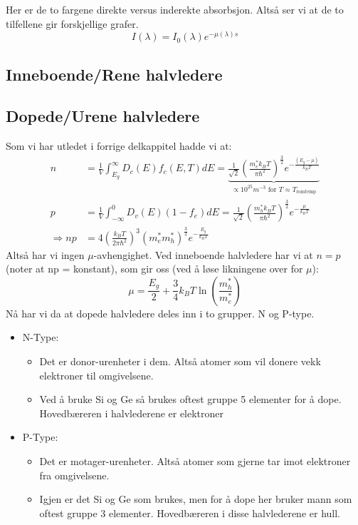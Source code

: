\documentclass{article}
\begin{document}
Her er de to fargene direkte versus inderekte absorbsjon. Altså ser vi at de to tilfellene gir forskjellige grafer.
\begin{equation*}
  I(\lambda) = I_0(\lambda) e^{-\mu (\lambda) s}
\end{equation*}






\subsection{Inneboende/Rene halvledere}
\subsection{Dopede/Urene halvledere}
Som vi har utledet i forrige delkappitel hadde vi at:
\begin{align*}
  n &= \frac{1}{V} \int_{E_g}^{\infty} D_c(E) f_c(E, T)dE = \underbrace{\frac{1}{\sqrt{2}} \left( \frac{m_e^{*} k_B T}{\pi \hbar^2}\right)^{\frac{3}{2}} e^{-\frac{(E_g - \mu)}{k_B T}} }_{\propto 10^{25} m^{-3}\text{ for } T \approx T_{\text{romtemp}}} \\
  p &=\frac{1}{V} \int_{-\infty}^0 D_v(E) (1-f_e) dE = \frac{1}{\sqrt{2}} \left( \frac{m_h^{*} k_B T}{\pi \hbar^2}\right)^{\frac{3}{2}} e^{-\frac{\mu}{k_B T}}\\
  \Rightarrow np &= 4 \left(\frac{k_B T}{2 \pi \hbar^2}\right)^3 (m_e^{*} m_h^{*})^{\frac{3}{2}} e^{-\frac{E_g}{k_B T}}
\end{align*}
Altså har vi ingen $\mu$-avhengighet. Ved inneboende halvledere har vi at $n=p$ (noter at np = konstant), som gir oss (ved å løse likningene over for $\mu$):
\begin{equation*}
  \mu = \frac{E_g}{2} + \frac{3}{4} k_B T \ln{\left(\frac{m_h^{*}}{m_e^{*}}  \right)}
\end{equation*}
Nå har vi da at dopede halvledere deles inn i to grupper. N og P-type.
\begin{itemize}
  \item N-Type:
  \begin{itemize}
    \item Det er donor-urenheter i dem. Altså atomer som vil donere vekk elektroner til omgivelsene.
    \item Ved å bruke Si og Ge så brukes oftest gruppe 5 elementer for å dope. Hovedbæreren i halvlederene er elektroner
  \end{itemize}
  \item P-Type: 
  \begin{itemize}
    \item Det er motager-urenheter. Altså atomer som gjerne tar imot elektroner fra omgivelsene.
    \item Igjen er det Si og Ge som brukes, men for å dope her bruker mann som oftest gruppe 3 elementer. Hovedbæreren i disse halvlederene er hull.
  \end{itemize}
\end{itemize}
\end{document}
